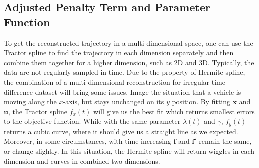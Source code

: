 



\subsection{Adjusted Penalty Term and Parameter Function}

To get the reconstructed trajectory in a multi-dimensional space, one can use the Tractor spline to find the trajectory in each dimension separately and then combine them together for a higher dimension, such as 2D and 3D. Typically, the data are not regularly sampled in time. Due to the property of Hermite spline, the combination of a multi-dimensional reconstruction for irregular time difference dataset will bring some issues.  Image the situation that a vehicle is moving along the $x$-axis, but stays unchanged on its $y$ position. By fitting $\mathbf{x}$ and $\mathbf{u}$, the Tractor spline $f_x(t)$ will give us the best fit which returns smallest errors to the objective function. While with the same parameter $\lambda(t)$ and $\gamma$, $f_y(t)$ returns a cubic curve, where it should give us a straight line as we expected. Moreover, in some circumstances, with time increasing $\mathbf{f}$ and $\mathbf{f}'$ remain the same, or change slightly. In this situation, the Hermite spline will return wiggles in each dimension and curves in combined two dimensions. 

